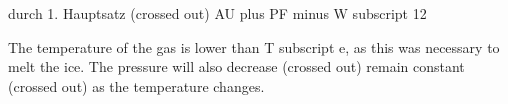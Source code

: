 durch 1. Hauptsatz (crossed out) AU plus PF minus W subscript 12

The temperature of the gas is lower than T subscript e, as this was necessary to melt the ice. The pressure will also decrease (crossed out) remain constant (crossed out) as the temperature changes.